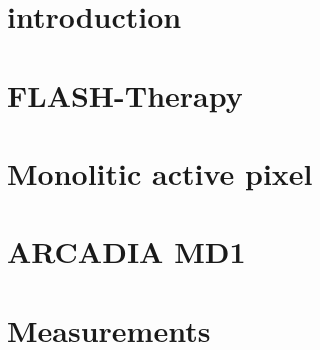 
\label{chip}
\begin{titlepage}

\section{introduction}

\section{FLASH-Therapy}

\section{Monolitic active pixel}

\section{ARCADIA MD1}

\section{Measurements}



\end{titlepage}
